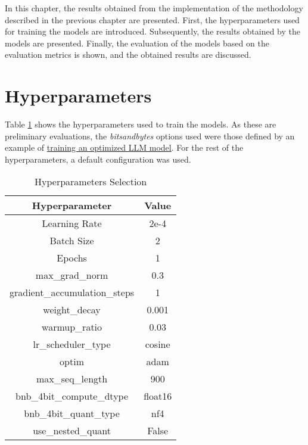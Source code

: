 In this chapter, the results obtained from the implementation of the methodology described in the previous chapter are presented. First, the hyperparameters used for training the models are introduced. Subsequently, the results obtained by the models are presented. Finally, the evaluation of the models based on the evaluation metrics is shown, and the obtained results are discussed.

\section{Hyperparameters}
Table \ref{table:hyperparameters2} shows the hyperparameters used to train the models. As these are preliminary evaluations, the \textit{bitsandbytes} options used were those defined by an example of \href{https://mlabonne.github.io/blog/posts/Fine_Tune_Your_Own_Llama_2_Model_in_a_Colab_Notebook.html}{training an optimized LLM model}. For the rest of the hyperparameters, a default configuration was used.

\begin{table}[H]
    \centering
    \begin{tabular}{|c|c|}
        \hline
        \textbf{Hyperparameter} & \textbf{Value} \\
        \hline
        Learning Rate & 2e-4 \\
        Batch Size & 2 \\
        Epochs & 1 \\
        max\_grad\_norm & 0.3 \\
        gradient\_accumulation\_steps & 1 \\
        weight\_decay & 0.001 \\
        warmup\_ratio & 0.03 \\
        lr\_scheduler\_type & cosine \\
        optim & adam \\
        max\_seq\_length & 900 \\
        bnb\_4bit\_compute\_dtype & float16 \\
        bnb\_4bit\_quant\_type & nf4 \\
        use\_nested\_quant & False \\
        \hline
    \end{tabular}
    \caption{Hyperparameters Selection}
    \label{table:hyperparameters2}
\end{table}

